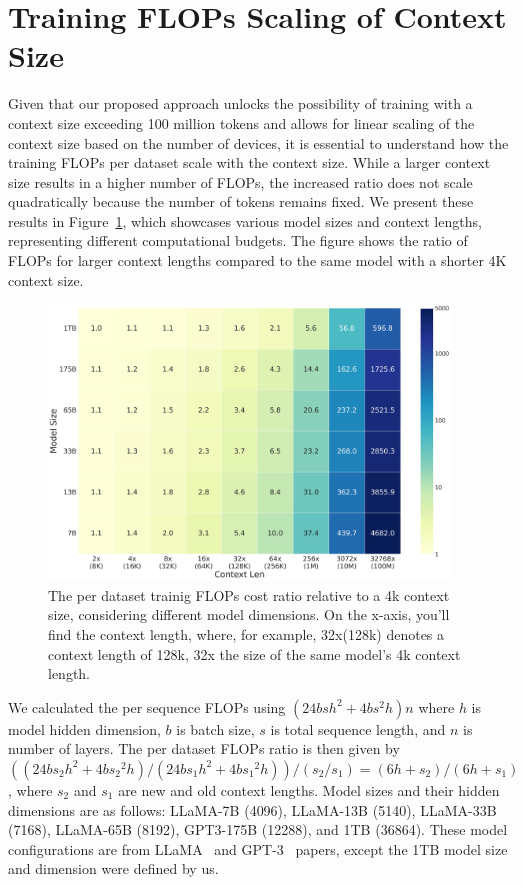 \documentclass{article}
\begin{document}
\section{Training FLOPs Scaling of Context Size}
Given that our proposed approach unlocks the possibility of training with a context size exceeding 100 million tokens and allows for linear scaling of the context size based on the number of devices, it is essential to understand how the training FLOPs per dataset scale with the context size. While a larger context size results in a higher number of FLOPs, the increased ratio does not scale quadratically because the number of tokens remains fixed. We present these results in Figure~\ref{fig:flops_cost}, which showcases various model sizes and context lengths, representing different computational budgets. The figure shows the ratio of FLOPs for larger context lengths compared to the same model with a shorter 4K context size.
\begin{figure}[!htbp]
    \centering
    \includegraphics[width=0.95\textwidth]{figures/cost_heatmap.png}
    \vspace{-1.2em}
    \caption{The per dataset trainig FLOPs cost ratio relative to a 4k context size, considering different model dimensions. On the x-axis, you'll find the context length, where, for example, 32x(128k) denotes a context length of 128k, 32x the size of the same model's 4k context length.}
    \label{fig:flops_cost}
\end{figure}
We calculated the per sequence FLOPs using $(24bsh^2+4bs^2h)n$ where $h$ is model hidden dimension, $b$ is batch size, $s$ is total sequence length, and $n$ is number of layers.
The per dataset FLOPs ratio is then given by $((24bs_2h^2+4b{s_2}^2h) / (24bs_1h^2+4b{s_1}^2h)) / (s_2 / s_1) = (6h+s_2) /(6h+s_1)$, where $s_2$ and $s_1$ are new and old context lengths.
Model sizes and their hidden dimensions are as follows: LLaMA-7B (4096), LLaMA-13B (5140), LLaMA-33B (7168), LLaMA-65B (8192), GPT3-175B (12288), and 1TB (36864). These model configurations are from LLaMA~\citep{touvron2023llama} and GPT-3~\citep{brown2020language} papers, except the 1TB model size and dimension were defined by us.
\end{document}
